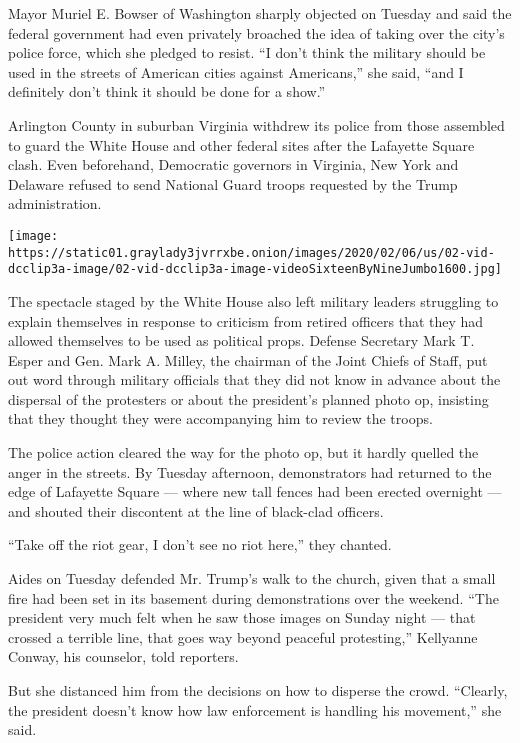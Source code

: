 Mayor Muriel E. Bowser of Washington sharply objected on Tuesday and
said the federal government had even privately broached the idea of
taking over the city's police force, which she pledged to resist. ``I
don't think the military should be used in the streets of American
cities against Americans,'' she said, ``and I definitely don't think it
should be done for a show.''

Arlington County in suburban Virginia withdrew its police from those
assembled to guard the White House and other federal sites after the
Lafayette Square clash. Even beforehand, Democratic governors in
Virginia, New York and Delaware refused to send National Guard troops
requested by the Trump administration.

\texttt{[image: https://static01.graylady3jvrrxbe.onion/images/2020/02/06/us/02-vid-dcclip3a-image/02-vid-dcclip3a-image-videoSixteenByNineJumbo1600.jpg]}

The spectacle staged by the White House also left military leaders
struggling to explain themselves in response to criticism from retired
officers that they had allowed themselves to be used as political props.
Defense Secretary Mark T. Esper and Gen. Mark A. Milley, the chairman of
the Joint Chiefs of Staff, put out word through military officials that
they did not know in advance about the dispersal of the protesters or
about the president's planned photo op, insisting that they thought they
were accompanying him to review the troops.

The police action cleared the way for the photo op, but it hardly
quelled the anger in the streets. By Tuesday afternoon, demonstrators
had returned to the edge of Lafayette Square --- where new tall fences
had been erected overnight --- and shouted their discontent at the line
of black-clad officers.

``Take off the riot gear, I don't see no riot here,'' they chanted.

Aides on Tuesday defended Mr. Trump's walk to the church, given that a
small fire had been set in its basement during demonstrations over the
weekend. ``The president very much felt when he saw those images on
Sunday night --- that crossed a terrible line, that goes way beyond
peaceful protesting,'' Kellyanne Conway, his counselor, told reporters.

But she distanced him from the decisions on how to disperse the crowd.
``Clearly, the president doesn't know how law enforcement is handling
his movement,'' she said.

